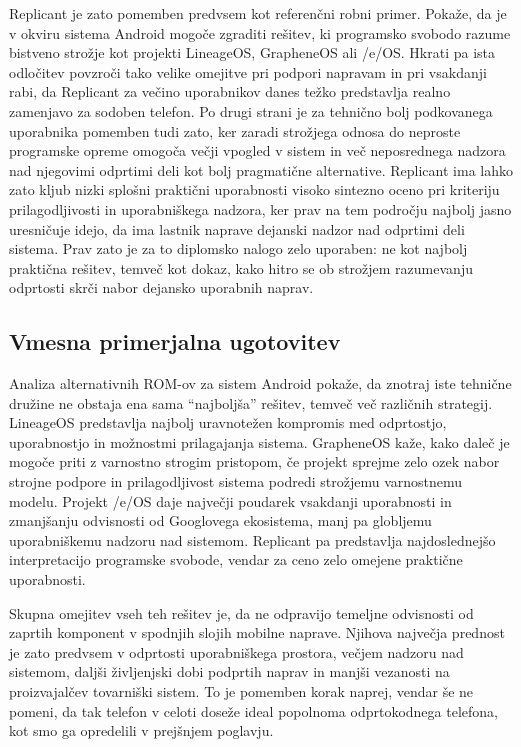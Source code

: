 \documentclass[a4paper,12pt,openright]{book}
\begin{document}
Replicant je zato pomemben predvsem kot referenčni robni primer.
Pokaže, da je v okviru sistema Android mogoče zgraditi rešitev, ki programsko svobodo razume bistveno strožje kot projekti LineageOS, GrapheneOS ali /e/OS.
Hkrati pa ista odločitev povzroči tako velike omejitve pri podpori napravam in pri vsakdanji rabi, da Replicant za večino uporabnikov danes težko predstavlja realno zamenjavo za sodoben telefon.
Po drugi strani je za tehnično bolj podkovanega uporabnika pomemben tudi zato, ker zaradi strožjega odnosa do neproste programske opreme omogoča večji vpogled v sistem in več neposrednega nadzora nad njegovimi odprtimi deli kot bolj pragmatične alternative.
Replicant ima lahko zato kljub nizki splošni praktični uporabnosti visoko sintezno oceno pri kriteriju prilagodljivosti in uporabniškega nadzora, ker prav na tem področju najbolj jasno uresničuje idejo, da ima lastnik naprave dejanski nadzor nad odprtimi deli sistema.
Prav zato je za to diplomsko nalogo zelo uporaben:
ne kot najbolj praktična rešitev, temveč kot dokaz, kako hitro se ob strožjem razumevanju odprtosti skrči nabor dejansko uporabnih naprav.

\subsection{Vmesna primerjalna ugotovitev}

Analiza alternativnih ROM-ov za sistem Android pokaže, da znotraj iste tehnične družine ne obstaja ena sama \enquote{najboljša} rešitev, temveč več različnih strategij.
LineageOS predstavlja najbolj uravnotežen kompromis med odprtostjo, uporabnostjo in možnostmi prilagajanja sistema.
GrapheneOS kaže, kako daleč je mogoče priti z varnostno strogim pristopom, če projekt sprejme zelo ozek nabor strojne podpore in prilagodljivost sistema podredi strožjemu varnostnemu modelu.
Projekt /e/OS daje največji poudarek vsakdanji uporabnosti in zmanjšanju odvisnosti od Googlovega ekosistema, manj pa globljemu uporabniškemu nadzoru nad sistemom.
Replicant pa predstavlja najdoslednejšo interpretacijo programske svobode, vendar za ceno zelo omejene praktične uporabnosti.

Skupna omejitev vseh teh rešitev je, da ne odpravijo temeljne odvisnosti od zaprtih komponent v spodnjih slojih mobilne naprave.
Njihova največja prednost je zato predvsem v odprtosti uporabniškega prostora, večjem nadzoru nad sistemom, daljši življenjski dobi podprtih naprav in manjši vezanosti na proizvajalčev tovarniški sistem.
To je pomemben korak naprej, vendar še ne pomeni, da tak telefon v celoti doseže ideal popolnoma odprtokodnega telefona, kot smo ga opredelili v prejšnjem poglavju.
\end{document}
